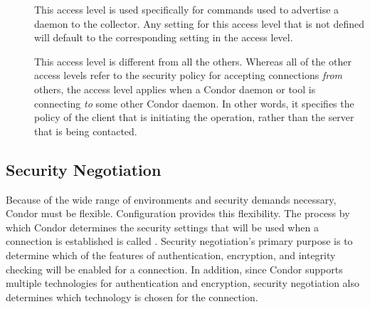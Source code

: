 \begin{description}
\item[] \label{sec-level-advertise-master} This
   access level is used specifically for commands used to advertise a
    daemon to the collector.  Any setting for this access
   level that is not defined will default to the corresponding setting
   in the  access level.

\item[] \label{sec-level-client} This access level is
   different from all the others.  Whereas all of the other access levels
   refer to the security policy for accepting connections \emph{from} others,
   the  access level applies when a Condor daemon or tool is
   connecting \emph{to} some other Condor daemon.  In other words, it specifies
   the policy of the client that is initiating the operation, rather than
   the server that is being contacted.

\end{description}

\subsection{\label{sec:Security-Negotiation}Security Negotiation}

Because of the wide range of environments and security demands necessary,
Condor must be flexible.
Configuration provides this flexibility.
The process by which Condor determines the security settings that will
be used when a connection is established is called
.
Security negotiation's primary purpose is to determine which
of the features of authentication, encryption, and integrity checking
will be enabled for a connection.
In addition, since Condor supports multiple
technologies for authentication and encryption,
security negotiation also
determines which technology is chosen for the connection.


